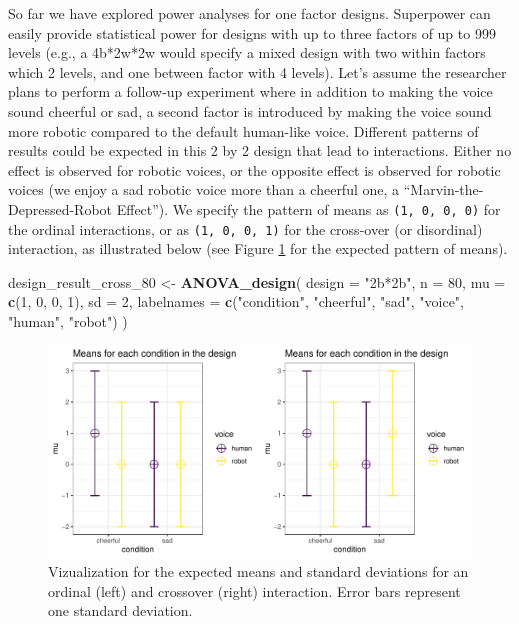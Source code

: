 \documentclass[
  ,jou,floatsintext]{apa6}
\newenvironment{Shaded}{\begin{snugshade}}{\end{snugshade}}
\newcommand{\DataTypeTok}[1]{\textcolor[rgb]{0.13,0.29,0.53}{#1}}
\newcommand{\DecValTok}[1]{\textcolor[rgb]{0.00,0.00,0.81}{#1}}
\newcommand{\KeywordTok}[1]{\textcolor[rgb]{0.13,0.29,0.53}{\textbf{#1}}}
\newcommand{\NormalTok}[1]{#1}
\newcommand{\StringTok}[1]{\textcolor[rgb]{0.31,0.60,0.02}{#1}}
\begin{document}
So far we have explored power analyses for one factor designs.
Superpower can easily provide statistical power for designs with up to three factors of up to 999 levels (e.g., a 4b*2w*2w would specify a mixed design with two within factors which 2 levels, and one between factor with 4 levels).
Let's assume the researcher plans to perform a follow-up experiment where in addition to making the voice sound cheerful or sad, a second factor is introduced by making the voice sound more robotic compared to the default human-like voice.
Different patterns of results could be expected in this 2 by 2 design that lead to interactions.
Either no effect is observed for robotic voices, or the opposite effect is observed for robotic voices (we enjoy a sad robotic voice more than a cheerful one, a \enquote{Marvin-the-Depressed-Robot Effect}).
We specify the pattern of means as \texttt{(1,\ 0,\ 0,\ 0)} for the ordinal interactions, or as \texttt{(1,\ 0,\ 0,\ 1)} for the cross-over (or disordinal) interaction, as illustrated below (see Figure \ref{fig:mean-plot} for the expected pattern of means).

\begin{Shaded}
\begin{Highlighting}[]
\NormalTok{design_result_cross_}\DecValTok{80}\NormalTok{ <-}\StringTok{ }\KeywordTok{ANOVA_design}\NormalTok{(}
 \DataTypeTok{design =} \StringTok{"2b*2b"}\NormalTok{, }\DataTypeTok{n =} \DecValTok{80}\NormalTok{, }
 \DataTypeTok{mu =} \KeywordTok{c}\NormalTok{(}\DecValTok{1}\NormalTok{, }\DecValTok{0}\NormalTok{, }\DecValTok{0}\NormalTok{, }\DecValTok{1}\NormalTok{), }\DataTypeTok{sd =} \DecValTok{2}\NormalTok{,}
 \DataTypeTok{labelnames =} \KeywordTok{c}\NormalTok{(}\StringTok{"condition"}\NormalTok{, }\StringTok{"cheerful"}\NormalTok{, }\StringTok{"sad"}\NormalTok{, }
                \StringTok{"voice"}\NormalTok{, }\StringTok{"human"}\NormalTok{, }\StringTok{"robot"}\NormalTok{)}
\NormalTok{)}
\end{Highlighting}
\end{Shaded}

\begin{figure}
\centering
\includegraphics{0.1_Simulation_Based_Power_Analysis_For_Factorial_ANOVA_Designs_files/figure-latex/mean-plot-1.pdf}
\caption{\label{fig:mean-plot}Vizualization for the expected means and standard deviations for an ordinal (left) and crossover (right) interaction. Error bars represent one standard deviation.}
\end{figure}
\end{document}
